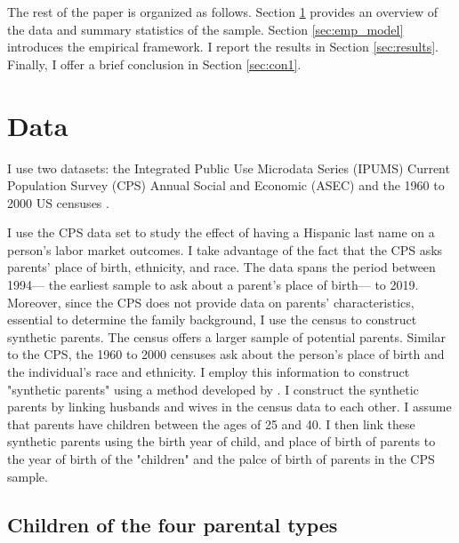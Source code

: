 \documentclass[a4paper,fleqn]{cas-sc}
\begin{document}
The rest of the paper is organized as follows. Section \ref{sec:data} provides an overview of the data and summary statistics of the sample. Section \ref{sec:emp_model} introduces the empirical framework. I report the results in Section \ref{sec:results}. Finally, I offer a brief conclusion in Section \ref{sec:con1}.

\section{Data}\label{sec:data}

I use two datasets:  the Integrated Public Use Microdata Series (IPUMS) Current Population Survey (CPS) Annual Social and Economic (ASEC) \citep{cps2019} and the 1960 to 2000 US censuses \citep{acs2019}.

I use the CPS data set to study the effect of having a Hispanic last name on a person's labor market outcomes. I take advantage of the fact that the CPS asks parents' place of birth, ethnicity, and race. The data spans the period between 1994--- the earliest sample to ask about a parent's place of birth--- to 2019. Moreover, since the CPS does not provide data on parents' characteristics, essential to determine the family background, I use the census to construct synthetic parents. The census offers a larger sample of potential parents. Similar to the CPS, the 1960 to 2000 censuses ask about the person's place of birth and the individual's race and ethnicity. I employ this information to construct "synthetic parents" using a method developed by \citet{rubinstein2014pride}. I construct the synthetic parents by linking husbands and wives in the census data to each other. I assume that parents have children between the ages of 25 and 40. I then link these synthetic parents using the birth year of child, and place of birth of parents to the year of birth of the "children" and the palce of birth of parents in the CPS sample.

\subsection{Children of the four parental types}
\end{document}
